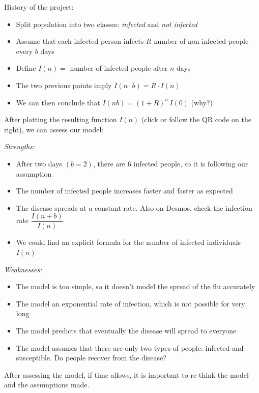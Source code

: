 \begin{example}

History of the project:
\begin{itemize}
	\item Split population into two classes: \emph{infected} and \emph{not infected}
	\item Assume that each infected person infects $R$ number of non infected people every $b$ days
	\item Define $I(n) = $ number of infected people after $n$ days
	\item The two previous points imply \quad $I(n \cdot b) = R \cdot I(n)$
	\item We can then conclude that \quad $I(n b) = (1+R)^n \, I(0)$ \hfill (why?)
\end{itemize}

After plotting the resulting function $I(n)$ (click or follow the QR code on the right), we can assess our model:

\emph{Strengths:}
\begin{itemize}
	\item After two days $(b=2)$, there are 6 infected people, so it is following our assumption
	\item The number of infected people increases faster and faster as expected 
	\item The disease spreads at a constant rate. Also on Desmos, check the infection rate $\dfrac{I(n+b)}{I(n)}$
	\item We could find an explicit formula for the number of infected individuals $I(n)$
\end{itemize}


\emph{Weaknesses:}
\begin{itemize}
	\item The model is too simple, so it doesn't model the spread of the flu accurately
	\item The model an exponential rate of infection, which is not possible for very long
	\item The model predicts that eventually the disease will spread to everyone
	\item The model assumes that there are only two types of people: infected and susceptible. Do people recover from the disease?
\end{itemize}

\end{example}




After assessing the model, if time allows, it is important to re-think the model and the assumptions made.





